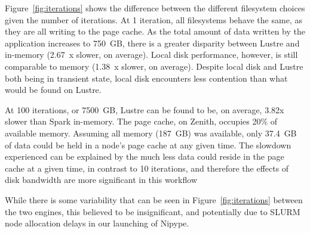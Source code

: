 \documentclass{IEEEtran}
\begin{document}
Figure~\ref{fig:iterations} shows the difference between the different 
filesystem choices given the number of iterations. At 1 iteration, all 
filesystems behave the same, as they are all writing to the page cache. As the 
total amount of data written by the application increases to 750~GB, there is a 
greater disparity between Lustre and in-memory (2.67~x slower, on average). 
Local disk performance, however, 
is still comparable to memory (1.38~x slower, on average). Despite local disk and 
Lustre both being in transient state, local disk encounters less contention 
than what would be found on Lustre. 



At 100 iterations, or 7500~GB, Lustre can be found to be, on average, 3.82x 
slower than Spark in-memory. The page cache, on Zenith, occupies 20\% of 
available memory. Assuming all memory (187~GB) was available, only 37.4~GB of 
data could be held in a node's page cache at any given time. The slowdown 
experienced can be explained by the much less data could reside in the page 
cache at a given time, in contrast to 10 iterations, and therefore the effects 
of disk bandwidth are more significant in this workflow

While there is some variability that can be seen in Figure~\ref{fig:iterations} 
between the two engines, this believed to be insignificant, and potentially due 
to SLURM node allocation delays in our launching of Nipype.

\end{document}
